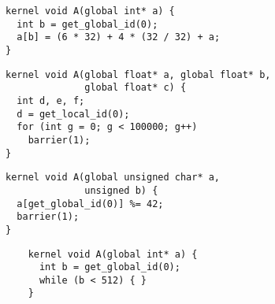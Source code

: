 \newsavebox{\BeignetPtrIntSpin}
\begin{lrbox}{\BeignetPtrIntSpin}
  \begin{minipage}{\textwidth}
    \begin{verbatim}
kernel void A(global int* a) {
  int b = get_global_id(0);
  a[b] = (6 * 32) + 4 * (32 / 32) + a;
}
    \end{verbatim}
  \end{minipage}
\end{lrbox}

\newsavebox{\NvidiaOptLoopHang}
\begin{lrbox}{\NvidiaOptLoopHang}
  \begin{minipage}{\textwidth}
    \begin{verbatim}
kernel void A(global float* a, global float* b,
              global float* c) {
  int d, e, f;
  d = get_local_id(0);
  for (int g = 0; g < 100000; g++)
    barrier(1);
}
    \end{verbatim}
  \end{minipage}
\end{lrbox}

\newsavebox{\XeonPhiSpin}
\begin{lrbox}{\XeonPhiSpin}
  \begin{minipage}{\textwidth}
    \begin{verbatim}
kernel void A(global unsigned char* a,
              unsigned b) {
  a[get_global_id(0)] %= 42;
  barrier(1);
}
    \end{verbatim}
  \end{minipage}
\end{lrbox}

\newsavebox{\IntelOptLoopHang}
\begin{lrbox}{\IntelOptLoopHang}
  \begin{minipage}{\textwidth}
    \begin{verbatim}
    kernel void A(global int* a) {
      int b = get_global_id(0);
      while (b < 512) { }
    }
    \end{verbatim}
  \end{minipage}
\end{lrbox}

